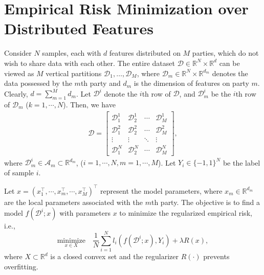 \section{Empirical Risk Minimization over Distributed Features}
\label{sec:problem}

Consider $N$ samples, each with $d$ features distributed on $M$ parties, which do not wish to share data with each other.
The entire dataset $\mathcal D\in \mathbb{R}^N\times\mathbb{R}^{d}$ can be viewed as $M$ vertical partitions $\mathcal D_1,\ldots,\mathcal D_M$, where
$\mathcal{D}_m\in\mathbb{R}^N\times\mathbb{R}^{d_m}$ denotes the data possessed by the $m$th party and $d_m$ is the dimension of features on party $m$. Clearly, $d=\sum_{m=1}^{M}d_m$. Let $\mathcal{D}^i$ denote the $i$th row of $\mathcal{D}$, and
$\mathcal{D}_m^i$ be the $i$th row of $\mathcal{D}_m$ ($k=1,\cdots,N$). Then, we have
\begin{eqnarray*}
	\mathcal{D} =
\left[
  \begin{array}{cccc}
    \mathcal{D}_1^1 & \mathcal{D}_2^1 & \cdots & \mathcal{D}_M^1 \\
    \mathcal{D}_1^2 & \mathcal{D}_2^2 &\cdots & \mathcal{D}_M^2 \\
    \vdots & \vdots & \ddots & \vdots \\
    \mathcal{D}_1^N & \mathcal{D}_2^N & \cdots & \mathcal{D}_M^N
  \end{array}
\right],
\end{eqnarray*}
where $\mathcal{D}_m^i\in\mathcal{A}_m\subset\mathbb{R}^{d_m}$, ($i=1,\cdots,N, m=1,\cdots,M$).
Let $Y_i\in\{-1, 1\}^N$ be the label of sample $i$. %

Let $x=(x_1^\top,\cdots,x_m^\top,\cdots,x_M^\top)^\top$ represent the model parameters, where $x_m\in\mathbb{R}^{d_m}$ are the local parameters associated with the $m$th party. The objective is to find a model $f(\mathcal{D}^i; x)$ with parameters $x$ %
to minimize the regularized empirical risk, i.e.,
\[
\underset{x \in X}{\text{minimize}} \quad\frac{1}{N}\sum_{i=1}^{N} l_i(f(\mathcal{D}^i; x), Y_i) + \lambda R(x),
\]
where $X\subset\mathbb{R}^d$ is a closed convex set and the regularizer $R(\cdot)$ prevents overfitting.

